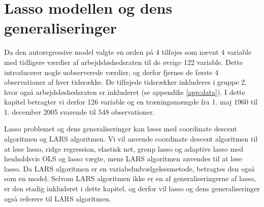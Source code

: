 \chapter{Lasso modellen og dens generaliseringer} \label{ch:shrinkage_metoder}
Da den autoregressive model valgte en orden på 4 tilføjes som nævnt 4 variable med tidligere værdier af arbejdsløshedsraten til de øvrige 122 variable. 
Dette introducerer nogle uobserverede værdier, og derfor fjernes de første 4 observationer af hver tidsrække.
De tilføjede tidsrækker inkluderes i gruppe 2, hvor også arbejdsløshedsraten er inkluderet (se appendiks \ref{app:data}).
I dette kapitel betragter vi derfor 126 variable og en træningsmængde fra 1. maj 1960 til 1. december 2005 svarende til 548 observationer. 

Lasso problemet og dens generaliseringer kan løses med coordinate descent algoritmen og LARS algoritmen.
Vi vil anvende coordinate descent algoritmen til at løse lasso, ridge regression, elastisk net, group lasso og adaptive lasso med henholdsvis OLS og lasso vægte, mens LARS algoritmen anvendes til at løse lasso. 
Da LARS algoritmen er en variabeludvælgelsesmetode, betragtes den også som en model.
Selvom LARS algoritmen ikke er en af generaliseringerne af lasso, er den stadig inkluderet i dette kapitel, og derfor vil lasso og dens generaliseringer også referere til LARS algoritmen.  



